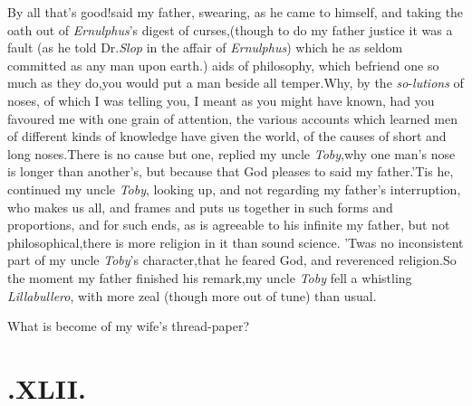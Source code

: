 \documentclass{article}
\begin{document}
By all that’s good!\@ said my father, swearing, as he came
to himself, and taking the oath out of \textit{Ernulphus}’s
digest of curses,\tsk (though to do my father
justice it was a fault (as he told Dr.\@ \textit{Slop} in the affair of
\textit{Ernulphus}) which he as seldom committed as any man upon
earth.)\tsh\break
{} \enlargethispage\baselineskip
{}
aids of philosophy, which befriend one\break
so much as they do,\tsk you would put a\break
man beside all temper.\tsk Why, by the
\textit{so}-\break\textit{lutions} of noses, of which I was telling you, I meant as
you might have known, had you favoured me with one grain of
attention, the various accounts which\break
learned men of different
kinds of know\-ledge have given the world, of the causes of short and
long noses.\tsk There is no cause but one, replied my
uncle \textit{Toby},\tsk why one man’s nose is longer
than ano\-ther’s, but because that God pleases to
 said
my father.\tsk ’Tis he, continued my uncle \textit{Toby},
looking up, and not regarding my father’s interruption, who
makes us all, and frames and puts us together in such forms and
proportions, and for such ends, as is agreeable to his
infinite\break
{} my father,
but not philosophical,\tsk there is more religion in it than sound
science. ’Twas no inconsistent part of my uncle
\textit{Toby}’s character,\tsk that he feared God, and
reverenced religion.\tsh So the moment my father finished
his remark,\tsh my uncle \textit{Toby} fell a whistling
\textit{Lillabullero}, with more zeal (though more out of tune) than
usual.\tsh

What is become of my wife’s thread-paper?

\section{.\quad  XLII.}
\end{document}
